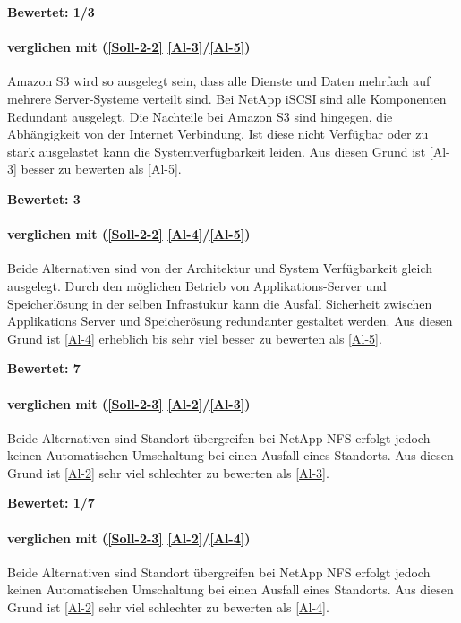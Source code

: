 \textbf{Bewertet: 1/3}

\paragraph*{  verglichen mit  (\ref{Soll-2-2} \ref{Al-3}/\ref{Al-5})}
Amazon S3 wird so ausgelegt sein, dass alle Dienste und Daten mehrfach auf mehrere Server-Systeme verteilt sind. Bei NetApp iSCSI sind alle Komponenten Redundant ausgelegt. Die Nachteile bei Amazon S3 sind hingegen, die Abhängigkeit von der Internet Verbindung. Ist diese nicht Verfügbar oder zu stark ausgelastet kann die Systemverfügbarkeit leiden.
Aus diesen Grund ist  \ref{Al-3} besser zu bewerten als  \ref{Al-5}.

\textbf{Bewertet: 3}


\paragraph*{  verglichen mit  (\ref{Soll-2-2} \ref{Al-4}/\ref{Al-5})}
Beide Alternativen sind von der Architektur und System Verfügbarkeit gleich ausgelegt. Durch den möglichen Betrieb von Applikations-Server und Speicherlösung in der selben Infrastukur kann die Ausfall Sicherheit zwischen Applikations Server und Speicherösung redundanter gestaltet werden. Aus diesen Grund ist  \ref{Al-4} erheblich bis sehr viel besser zu bewerten als  \ref{Al-5}.

\textbf{Bewertet: 7}


\paragraph*{  verglichen mit  (\ref{Soll-2-3} \ref{Al-2}/\ref{Al-3})}
Beide Alternativen sind Standort übergreifen bei NetApp NFS erfolgt jedoch keinen Automatischen Umschaltung bei einen Ausfall eines Standorts. Aus diesen Grund ist  \ref{Al-2} sehr viel schlechter zu bewerten als  \ref{Al-3}.

\textbf{Bewertet: 1/7}

\paragraph*{  verglichen mit  (\ref{Soll-2-3} \ref{Al-2}/\ref{Al-4})}
Beide Alternativen sind Standort übergreifen bei NetApp NFS erfolgt jedoch keinen Automatischen Umschaltung bei einen Ausfall eines Standorts. Aus diesen Grund ist  \ref{Al-2} sehr viel schlechter zu bewerten als  \ref{Al-4}.

